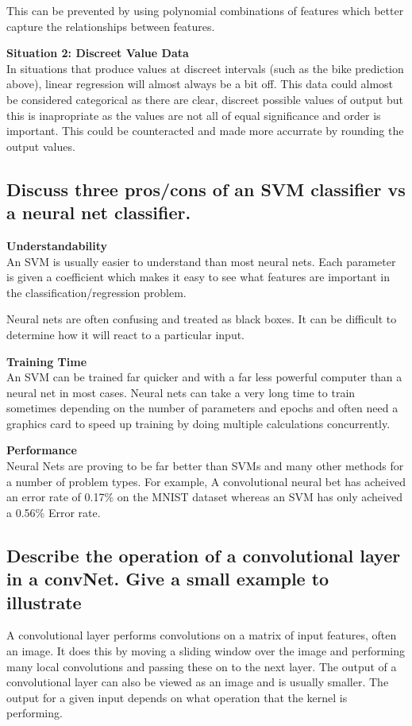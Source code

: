 This can be prevented by using polynomial combinations of features which better capture the relationships between features.
\par
\textbf{Situation 2: Discreet Value Data\\}
In situations that produce values at discreet intervals (such as the bike prediction above), 
linear regression will almost always be a bit off. 
This data could almost be considered categorical as there are clear, 
discreet possible values of output but this is inapropriate as the values are not all of equal significance and order is important.
This could be counteracted and made more accurrate by rounding the output values.

\subsection{Discuss three pros/cons of an SVM classifier vs a neural net classifier.}


\textbf{Understandability\\}
An SVM is usually easier to understand than most neural nets. 
Each parameter is given a coefficient which makes it easy to see what features are important in the classification/regression problem.
\par
Neural nets are often confusing and treated as black boxes.
It can be difficult to determine how it will react to a particular input. 
\par
\textbf{Training Time\\}
An SVM can be trained far quicker and with a far less powerful computer than a neural net in most cases.
Neural nets can take a very long time to train sometimes depending on the number of parameters and epochs and often need a graphics card to speed up training by doing multiple calculations concurrently.
\par 

\textbf{Performance\\}
Neural Nets are proving to be far better than SVMs and many other methods for a number of problem types.
For example, A convolutional neural bet has acheived an error rate of 0.17\% on the MNIST dataset whereas 
an SVM has only acheived a 0.56\% Error rate.

\subsection{Describe the operation of a convolutional layer in a convNet. Give a small
example to illustrate}
A convolutional layer performs convolutions on a matrix of input features, often an image. 
It does this by moving a sliding window over the image and performing many local convolutions and passing these on to the next layer.
The output of a convolutional layer can also be viewed as an image and is usually smaller.
The output for a given input depends on what operation that the kernel is performing.

